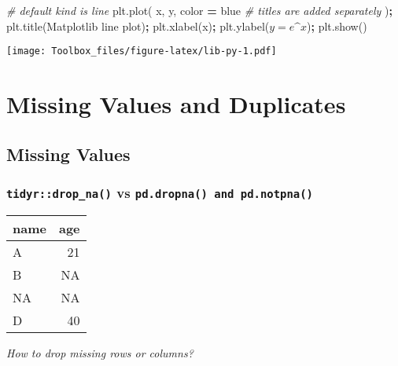 \documentclass[
]{book}
\newenvironment{Shaded}{\begin{snugshade}}{\end{snugshade}}
\newcommand{\CommentTok}[1]{\textcolor[rgb]{0.56,0.35,0.01}{\textit{#1}}}
\newcommand{\NormalTok}[1]{#1}
\newcommand{\OperatorTok}[1]{\textcolor[rgb]{0.81,0.36,0.00}{\textbf{#1}}}
\newcommand{\StringTok}[1]{\textcolor[rgb]{0.31,0.60,0.02}{#1}}
\begin{document}
\begin{Shaded}
\begin{Highlighting}[]
\CommentTok{\# default \textquotesingle{}kind\textquotesingle{} is \textquotesingle{}line\textquotesingle{}}
\NormalTok{plt.plot(}
\NormalTok{  x, y,}
\NormalTok{  color }\OperatorTok{=} \StringTok{\textquotesingle{}blue\textquotesingle{}}
  \CommentTok{\# titles are added separately}
\NormalTok{)}\OperatorTok{;}
\NormalTok{plt.title(}\StringTok{\textquotesingle{}Matplotlib line plot\textquotesingle{}}\NormalTok{)}\OperatorTok{;}
\NormalTok{plt.xlabel(}\StringTok{\textquotesingle{}x\textquotesingle{}}\NormalTok{)}\OperatorTok{;}
\NormalTok{plt.ylabel(}\StringTok{\textquotesingle{}$y = e\^{}x$\textquotesingle{}}\NormalTok{)}\OperatorTok{;}
\NormalTok{plt.show()}
\end{Highlighting}
\end{Shaded}

\texttt{[image: Toolbox\_files/figure-latex/lib-py-1.pdf]}

\hypertarget{missing-values-and-duplicates}{%
\chapter{Missing Values and Duplicates}\label{missing-values-and-duplicates}}

\hypertarget{missing-values}{%
\section{Missing Values}\label{missing-values}}

\hypertarget{tidyrdrop_na-vs-pd.dropna-and-pd.notpna}{%
\subsection{\texorpdfstring{\texttt{tidyr::drop\_na()} vs \texttt{pd.dropna()\ and\ pd.notpna()}}{tidyr::drop\_na() vs pd.dropna() and pd.notpna()}}\label{tidyrdrop_na-vs-pd.dropna-and-pd.notpna}}

\begin{longtable}[]{@{}lr@{}}
\toprule
name & age \\
\midrule
\endhead
A & 21 \\
B & NA \\
NA & NA \\
D & 40 \\
\bottomrule
\end{longtable}

\emph{How to drop missing rows or columns?}
\end{document}
